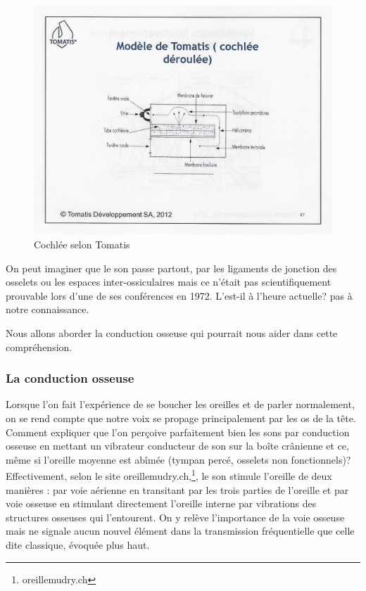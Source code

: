 \begin{figure}
	\centering
	\includegraphics[width=0.7\linewidth]{images/Cochleederoule_haut}
	\caption[Cochlée selon Tomatis]{Cochlée selon Tomatis}
	\label{fig:cochleederoulehaut}
\end{figure}


On peut imaginer que le son passe
partout, par les ligaments de jonction des osselets ou les espaces
inter-ossiculaires mais %
ce n'était pas scientifiquement prouvable lors d'une de ses conférences
en 1972. L'est-il à l'heure actuelle? pas à notre connaissance. 

Nous allons aborder la conduction osseuse qui pourrait nous aider
dans cette compréhension.

\subsubsection{La conduction osseuse}

Lorsque l'on fait l'expérience de se
boucher les oreilles et de parler normalement, on se rend compte que
notre voix se propage principalement par les os de la tête. Comment
expliquer que l'on perçoive parfaitement bien les sons par conduction
osseuse en mettant un vibrateur conducteur de son sur la boîte crânienne et ce, même si l'oreille moyenne est abîmée (tympan percé, osselets non fonctionnels)?
Effectivement, selon le site oreillemudry.ch,\footnote{oreillemudry.ch}, 
le son stimule l'oreille de deux manières : par voie aérienne en transitant
par les trois parties de l'oreille et par voie osseuse en stimulant
directement l'oreille interne par vibrations des structures osseuses
qui l'entourent. On y relève l'importance de la voie osseuse
mais ne signale aucun nouvel élément dans la transmission
fréquentielle que celle dite classique, évoquée plus haut.

